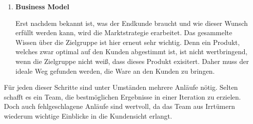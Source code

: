 \begin{enumerate}
	\item \textbf{Business Model}
	
	Erst nachdem bekannt ist, was der Endkunde braucht und wie dieser Wunsch erfüllt werden kann, wird die Marktstrategie erarbeitet. Das gesammelte Wissen über die Zielgruppe ist hier erneut sehr wichtig. Denn ein Produkt, welches zwar optimal auf den Kunden abgestimmt ist, ist nicht wertbringend, wenn die Zielgruppe nicht weiß, dass dieses Produkt exisitert. Daher muss der ideale Weg gefunden werden, die Ware an den Kunden zu bringen. 
\end{enumerate}

Für jeden dieser Schritte sind unter Umständen mehrere Anläufe nötig. Selten schafft es ein Team, die bestmöglichen Ergebnisse in einer Iteration zu erzielen. Doch auch fehlgeschlagene Anläufe sind wertvoll, da das Team aus Irrtümern wiederum wichtige Einblicke in die Kundensicht erlangt. 
\cite{TheInnovatorsMethod}
\newpage 